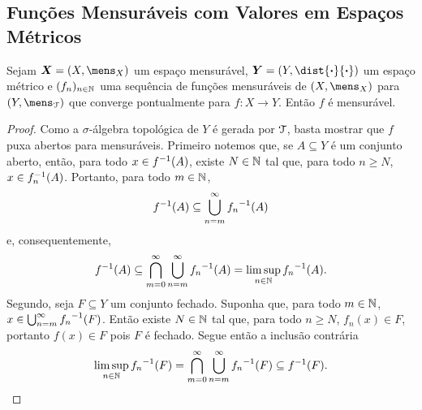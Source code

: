 \subsection{Funções Mensuráveis com Valores em Espaços Métricos}

\begin{prop}
\label{ana:conv.pont.func.mens}
Sejam $\bm X = (X,\mens_X)$ um espaço mensurável, $\bm Y = (Y,\dist{\var}{\var})$ um espaço métrico e $(f_n)_{n \in \mathbb{N}}$ uma sequência de funções mensuráveis de $(X,\mens_X)$ para $(Y,\mens_\topo)$ que converge pontualmente para $f\colon X \to Y$. Então $f$ é mensurável.
\end{prop}
\begin{proof}
Como a $\sigma$-álgebra topológica de $Y$ é gerada por $\mathcal{T}$, basta mostrar que $f$ puxa abertos para mensuráveis. Primeiro notemos que, se $A \subseteq Y$ é um conjunto aberto, então, para todo $x \in f^{-1}(A)$, existe $N \in \mathbb{N}$ tal que, para todo $n \geq N$, $x \in f_n^{-1}(A)$. Portanto, para todo $m \in \mathbb{N}$,
	\begin{equation*}
	f^{-1}(A) \subseteq \bigcup_{n=m}^\infty {f_n}^{-1} (A)
	\end{equation*}
e, consequentemente,
	\begin{equation*}
	f^{-1}(A) \subseteq \bigcap_{m=0}^\infty \bigcup_{n=m}^\infty {f_n}^{-1}(A) = \limsup_{n \in \mathbb{N}} {f_n}^{-1}(A).
	\end{equation*}
Segundo, seja $F \subseteq Y$ um conjunto fechado. Suponha que, para todo $m \in \mathbb{N}$, $x \in \bigcup_{n=m}^\infty {f_n}^{-1} (F)$. Então existe $N \in \mathbb{N}$ tal que, para todo $n \geq N$, $f_n(x) \in F$, portanto $f(x) \in F$ pois $F$  é fechado. Segue então a inclusão contrária
	\begin{equation*}
	\limsup_{n \in \mathbb{N}} {f_n}^{-1}(F) = \bigcap_{m=0}^\infty \bigcup_{n=m}^\infty {f_n}^{-1}(F) \subseteq f^{-1}(F).
	\end{equation*}


\end{proof}
